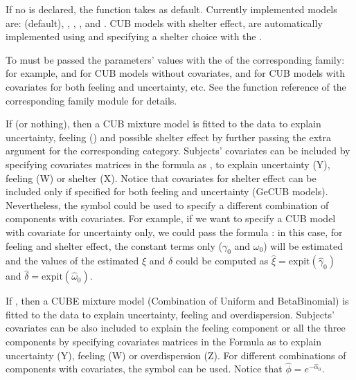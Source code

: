 \documentclass[letterpaper,10pt,english]{sphinxmanual}
\begin{document}
\sphinxAtStartPar
If no   is declared, the function takes  as default.
Currently implemented models are:  (default), , ,
, and . CUB models with shelter effect, are automatically
implemented using  and specifying a shelter choice with the
 .

\sphinxAtStartPar
To  must be passed the parameters’ values with the  of the corresponding
family: for example,  and  for CUB models without covariates,  and 
for CUB models with covariates for both feeling and uncertainty, etc. See the
 function reference of the corresponding family module for details.

\sphinxAtStartPar
If   (or nothing), then a CUB mixture model is fitted to the data to explain uncertainty,
feeling () and possible shelter effect by further passing the extra argument  for the corresponding category.
Subjects’ covariates can be included by specifying covariates matrices in the
formula as ,  to explain uncertainty (Y), feeling (W) or shelter (X).
Notice that
covariates for shelter effect can be included only if specified for both feeling and uncertainty (GeCUB models).
Nevertheless, the symbol  could be used to specify a different combination of components with covariates.
For example, if we want to specify a CUB model with covariate  for uncertainty only, we could pass the
formula : in this case, for feeling and shelter effect, the constant terms only
(\(\gamma_0\) and \(\omega_0\)) will be estimated and the values of the estimated \(\xi\) and
\(\delta\) could be computed as \(\hat\xi=\mathrm{expit}(\hat\gamma_0)\) and
\(\hat\delta=\mathrm{expit}(\hat\omega_0)\).

\sphinxAtStartPar
If , then a CUBE mixture model (Combination of Uniform and Beta\sphinxhyphen{}Binomial) is fitted to the data
to explain uncertainty, feeling and overdispersion.   Subjects’ covariates can be also included to explain the
feeling component or all the three components by  specifying covariates matrices in the Formula as
 to explain uncertainty (Y), feeling (W) or
overdispersion (Z). For different combinations of components with covariates, the symbol  can be used.
Notice that \(\hat\phi=e^{-\hat\alpha_0}\).
\end{document}
